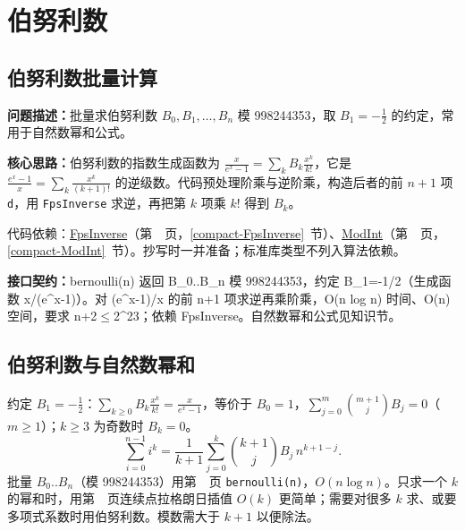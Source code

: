 \Needspace{371pt}

\section{伯努利数}

\subsection{伯努利数批量计算}\label{compact-bernoulli}

\noindent\textbf{问题描述：}\allowbreak 批量求伯努利数 $B_0,B_1,\dots,B_n$ 模 998244353，取 $B_1=-\frac12$ 的约定，常用于自然数幂和公式。

\textbf{核心思路：}\allowbreak 伯努利数的指数生成函数为 $\frac{x}{e^x-1}=\sum_kB_k\frac{x^k}{k!}$，它是 $\frac{e^x-1}{x}=\sum_k\frac{x^k}{(k+1)!}$ 的逆级数。代码预处理阶乘与逆阶乘，构造后者的前 $n+1$ 项 \texttt{d}，用 \texttt{FpsInverse} 求逆，再把第 $k$ 项乘 $k!$ 得到 $B_k$。

代码依赖：\hyperref[compact-FpsInverse]{FpsInverse}（第~\pageref{compact-FpsInverse}~页，\ref{compact-FpsInverse}~节）、\hyperref[compact-ModInt]{ModInt}（第~\pageref{compact-ModInt}~页，\ref{compact-ModInt}~节）。抄写时一并准备；标准库类型不列入算法依赖。

{\sloppy{}\noindent\textbf{接口契约：}bernoulli(n) 返回 B\_0..B\_n 模 998244353，约定 B\_1=-1/2（生成函数 x/(e\textasciicircum{}x-1)）。对 (e\textasciicircum{}x-1)/x 的前 n+1 项求逆再乘阶乘，O(n log n) 时间、O(n) 空间，要求 n+2$\le$2\textasciicircum{}23；依赖 FpsInverse。自然数幂和公式见知识节。\par}



\subsection{伯努利数与自然数幂和}\label{knowledge-bernoulli}
约定 $B_1=-\tfrac12$：$\displaystyle\sum_{k\ge0}B_k\frac{x^k}{k!}=\frac{x}{e^x-1}$，等价于 $B_0=1$，$\sum_{j=0}^{m}\binom{m+1}{j}B_j=0$（$m\ge1$）；$k\ge3$ 为奇数时 $B_k=0$。
\[
\sum_{i=0}^{n-1}i^k=\frac{1}{k+1}\sum_{j=0}^{k}\binom{k+1}{j}B_j\,n^{k+1-j}.
\]
批量 $B_0..B_n$（模 998244353）用第~\pageref{compact-bernoulli}~页 \texttt{bernoulli(n)}，$O(n\log n)$。只求一个 $k$ 的幂和时，用第~\pageref{compact-lagrange_consecutive}~页连续点拉格朗日插值 $O(k)$ 更简单；需要对很多 $k$ 求、或要多项式系数时用伯努利数。模数需大于 $k+1$ 以便除法。



